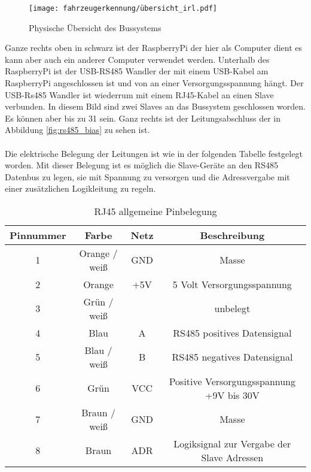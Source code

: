 \begin{figure}[H]
    \centering
    \texttt{[image: fahrzeugerkennung/übersicht\_irl.pdf]}
    \caption{Physische Übersicht des Bussystems}
\end{figure}
Ganze rechts oben in schwarz ist der RaspberryPi der hier als Computer dient es kann aber auch ein anderer Computer verwendet werden. Unterhalb des RaspberryPi ist der USB-RS485 Wandler der mit einem USB-Kabel
am RaspberryPi angeschlossen ist und von an einer Versorgungsspannung hängt. Der USB-Rs485 Wandler ist wiederrum mit einem RJ45-Kabel an einen Slave verbunden. In diesem Bild sind zwei Slaves an das Bussystem geschlossen worden.
Es können aber bis zu 31 sein. Ganz rechts ist der Leitungsabschluss der in Abbildung \ref{fig:rs485_bias} zu sehen ist.
\\ \\
Die elektrische Belegung der Leitungen ist wie in der folgenden Tabelle festgelegt worden. Mit dieser Belegung ist es möglich die Slave-Geräte an den RS485 Datenbus zu legen,
sie mit Spannung zu versorgen und die Adressvergabe mit einer zusätzlichen Logikleitung zu regeln. 

\begin{table}[h]
    \centering
    \begin{tabular}{|c|c|c|c|}
        \hline
        \textbf{Pinnummer} & \textbf{Farbe} & \textbf{Netz} & \textbf{Beschreibung}                      \\ \hline
        1                  & Orange / weiß  & GND           & Masse                                      \\ \hline
        2                  & Orange         & +5V           & 5 Volt Versorgungsspannung                 \\ \hline
        3                  & Grün / weiß    &               & unbelegt                                   \\ \hline
        4                  & Blau           & A             & RS485 positives Datensignal                \\ \hline
        5                  & Blau / weiß    & B             & RS485 negatives Datensignal                \\ \hline
        6                  & Grün           & VCC           & Positive Versorgungsspannung +9V bis 30V   \\ \hline
        7                  & Braun / weiß   & GND           & Masse                                      \\ \hline
        8                  & Braun          & ADR           & Logiksignal zur Vergabe der Slave Adressen \\ \hline
    \end{tabular}
    \caption{RJ45 allgemeine Pinbelegung}
\end{table}

